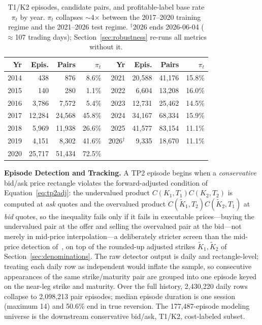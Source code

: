 \documentclass[sigconf,review]{acmart}
\begin{document}
\begin{table}[t]
\centering
\footnotesize
\begin{tabular}{rrrr@{\hskip 1.4em}rrrr}
\toprule
Yr & Epis. & Pairs & $\pi_t$ & Yr & Epis. & Pairs & $\pi_t$ \\
\midrule
2014 & 438 & 876 & 8.6\% & 2021 & 20{,}588 & 41{,}176 & 15.8\% \\
2015 & 140 & 280 & 1.1\% & 2022 & 6{,}604 & 13{,}208 & 16.0\% \\
2016 & 3{,}786 & 7{,}572 & 5.4\% & 2023 & 12{,}731 & 25{,}462 & 14.5\% \\
2017 & 12{,}284 & 24{,}568 & 45.8\% & 2024 & 34{,}167 & 68{,}334 & 15.9\% \\
2018 & 5{,}969 & 11{,}938 & 26.6\% & 2025 & 41{,}577 & 83{,}154 & 11.1\% \\
2019 & 4{,}151 & 8{,}302 & 41.6\% & 2026$^\dagger$ & 9{,}335 & 18{,}670 & 11.1\% \\
2020 & 25{,}717 & 51{,}434 & 72.5\% & & & & \\
\bottomrule
\end{tabular}
\caption{T1/K2 episodes, candidate pairs, and profitable-label base rate $\pi_t$ by year. $\pi_t$ collapses $\sim$4$\times$ between the 2017--2020 training regime and the 2021--2026 test regime. $^\dagger$2026 ends 2026-06-04 ($\approx$107 trading days); Section~\ref{sec:robustness} re-runs all metrics without it.}
\label{tab:peryear}
\end{table}

\medskip\noindent\textbf{Episode Detection and Tracking.}
\label{sec:episode-tracking}
A TP2 episode begins when a \emph{conservative} bid/ask price rectangle violates the forward-adjusted condition of Equation~\eqref{eq:tp2adj}: the undervalued product $C(K_1,T_1)C(K_2,T_2)$ is computed at \emph{ask} quotes and the overvalued product $C(\tilde K_1,T_2)C(\tilde K_2,T_1)$ at \emph{bid} quotes, so the inequality fails only if it fails in executable prices---buying the undervalued pair at the offer and selling the overvalued pair at the bid---not merely in mid-price interpolation---a deliberately stricter screen than the mid-price detection of~\cite{glasserman2025tp2}, on top of the rounded-up adjusted strikes $\tilde K_1,\tilde K_2$ of Section~\ref{sec:denominations}. The raw detector output is daily and rectangle-level; treating each daily row as independent would inflate the sample, so consecutive appearances of the same strike/maturity pair are grouped into one episode keyed on the near-leg strike and maturity. Over the full history, 2{,}430{,}220 daily rows collapse to 2{,}098{,}213 pair episodes; median episode duration is one session (maximum 14) and 50.6\% end in true reversion. The 177{,}487-episode modeling universe is the downstream conservative bid/ask, T1/K2, cost-labeled subset.
\end{document}
